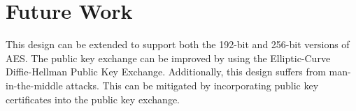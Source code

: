 \documentclass[journal]{IEEEtran}
\begin{document}
\section{Future Work}
This design can be extended to support both the 192-bit and 256-bit versions of AES. The public key exchange can be improved by using the Elliptic-Curve Diffie-Hellman Public Key Exchange. Additionally, this design suffers from man-in-the-middle attacks. This can be mitigated by incorporating public key certificates into the public key exchange.


%


\appendices


\ifCLASSOPTIONcaptionsoff
  \newpage
\fi

\end{document}
